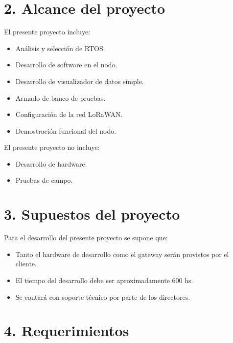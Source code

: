 \documentclass[11pt]{charter}
\begin{document}
\section{2. Alcance del proyecto}
\label{sec:alcance}

El presente proyecto incluye: 

\begin{itemize}
\item Análisis y selección de RTOS.
\item Desarrollo de software en el nodo.
\item Desarrollo de visualizador de datos simple.
\item Armado de banco de pruebas.
\item Configuración de la red LoRaWAN.
\item Demostración funcional del nodo.
\end{itemize}

El presente proyecto no incluye: 
\begin{itemize}
\item Desarrollo de hardware.
\item Pruebas de campo.
\end{itemize}

\section{3. Supuestos del proyecto}
\label{sec:supuestos}

Para el desarrollo del presente proyecto se supone que:

\begin{itemize}
\item Tanto el hardware de desarrollo como el gateway serán provistos por el cliente.
\item El tiempo del desarrollo debe ser aproximadamente 600 hs.
\item Se contará con soporte técnico por parte de los directores.
\end{itemize}

\section{4. Requerimientos}
\label{sec:requerimientos}
\end{document}
